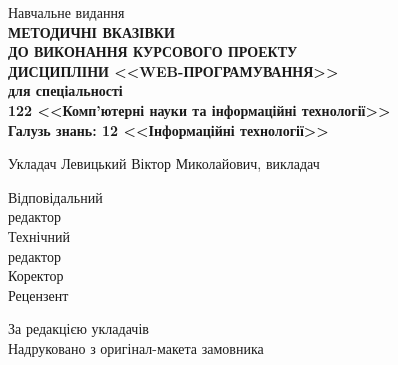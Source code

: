 \begin{center}
Навчальне видання\\
{\bf
МЕТОДИЧНІ ВКАЗІВКИ\\
ДО ВИКОНАННЯ КУРСОВОГО ПРОЕКТУ\\
ДИСЦИПЛІНИ <<WEB-ПРОГРАМУВАННЯ>>\\
для спеціальності\\ 
122 <<Комп'ютерні науки та інформаційні технології>>\\
Галузь знань: 12  <<Інформаційні технології>>\\
}
\end{center}
\vspace{2em}
Укладач		     
\hfill
Левицький Віктор Миколайович, викладач \\
\begin{center}
\end{center}
Відповідальний \hfill \\
редактор              \\          
Технічний \hfill \\
редактор     \\
Коректор      \hfill \\                 
Рецензент         \hfill \\                                                   
\begin{center}
\end{center}
\vspace{1em}
За редакцією укладачів \\
Надруковано з оригінал-макета замовника \\



\tableofcontents


